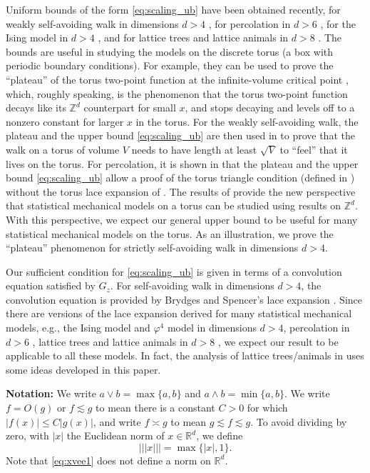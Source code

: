 \documentclass[11pt,hidelinks]{article}
\theoremstyle{plain}
\numberwithin{equation}{section}
\newcommand{\eg}{e.g.}
\newcommand{\Z}{\mathbb{Z}}
\newcommand{\R}{\mathbb{R}}
\renewcommand{\(}{\left(}
\renewcommand{\)}{\right)}
\newcommand{\1}{\mathds{1}}
\providecommand{\abs}[1]{\lvert#1\rvert}
\newcommand{\veee}[1]{|\!|\!|#1|\!|\!|}
\newcommand{\xvee}{\veee{x}}
\begin{document}
Uniform bounds of the form \eqref{eq:scaling_ub} have been obtained recently, for weakly self-avoiding walk in dimensions $d>4$ \cite{Slad23_wsaw}, for percolation in $d>6$ \cite{HMS23},
for the Ising model in $d>4$ \cite{DP25-Ising}, 
and for lattice trees and lattice animals in $d>8$ \cite{LS25a}.
The bounds are useful in studying the models on the discrete torus (a box with periodic boundary conditions).
For example, they can be used to prove the ``plateau'' of the torus two-point function at the infinite-volume critical point \cite{LPS25-universal}, which, roughly speaking, is the phenomenon that the torus two-point function decays like its $\Z^d$ counterpart for small $x$, and stops decaying and levels off to a nonzero constant for larger $x$ in the torus. 
For the weakly self-avoiding walk, the plateau and the upper bound \eqref{eq:scaling_ub} are then used in \cite{MS23, Mich23} to prove that the walk on a torus of volume $V$ needs to have length at least $\sqrt V$ to ``feel'' that it lives on the torus. 
For percolation, it is shown in \cite{HMS23} that the plateau and the upper bound \eqref{eq:scaling_ub} allow a proof of the torus triangle condition (defined in \cite{BCHSS05a}) without the torus lace expansion of \cite{BCHSS05b}. 
The results of \cite{MS23, Mich23, HMS23, LPS25-universal} provide the new perspective that statistical mechanical models on a torus can be studied using results on $\Z^d$. 
With this perspective, we expect our general upper bound to be useful for many statistical mechanical models on the torus. 
As an illustration, we prove the ``plateau'' phenomenon for strictly self-avoiding walk in dimensions $d>4$. 

Our sufficient condition for \eqref{eq:scaling_ub} is given in terms of a convolution equation satisfied by $G_z$.
For self-avoiding walk in dimensions $d>4$, the convolution equation is provided by Brydges and Spencer's lace expansion \cite{BS85, Slad06}. 
Since there are versions of the lace expansion derived for many statistical mechanical models, \eg,
the Ising model \cite{Saka07} and $\varphi^4$ model \cite{BHH21, Saka15} in dimensions $d > 4$,
percolation in $d > 6$ \cite{HS90a, FH17}, 
lattice trees and lattice animals in $d > 8$ \cite{HS90b,FH21}, 
we expect our result to be applicable to all these models.
In fact, the analysis of lattice trees/animals in \cite{LS25a} uses some ideas developed in this paper.


\medskip\noindent
{\bf Notation:}  
We write $a \vee b = \max \{ a , b \}$ and $a \wedge b = \min \{ a , b \}$.
We write $f = O(g)$ or $f \lesssim g$ to mean there is a constant $C> 0$ for which $\abs {f(x)} \le C\abs {g(x)}$, 
and write $f \asymp g$ to mean $g \lesssim f \lesssim g$.
To avoid dividing by zero, with $|x|$ the Euclidean norm of $x\in \R^d$, we define
\begin{equation}
\label{eq:xvee1}
	\xvee = \max\{|x| , 1\}.
\end{equation}
Note that \eqref{eq:xvee1} does not define a norm on $\R^d$.
\end{document}
